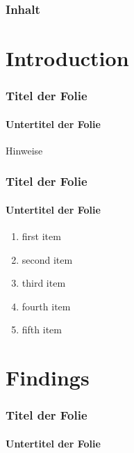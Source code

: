 \begin{frame}

\maketitle

\end{frame}

\begin{frame}
\frametitle{Inhalt}

\tableofcontents

\end{frame}

\section{Introduction}

\begin{frame}
\frametitle{Titel der Folie}
\framesubtitle{Untertitel der Folie}

\begin{alert}{Hinweise}
{\scriptsize \blindtext}
\end{alert}


\end{frame}


\begin{frame}
\frametitle{Titel der Folie}
\framesubtitle{Untertitel der Folie}

\begin{enumerate}
\item first item
\item second item
\item third item
\item fourth item
\item fifth item
\end{enumerate}


\end{frame}

\section{Findings}

\begin{frame}
\frametitle{Titel der Folie}
\framesubtitle{Untertitel der Folie}

\blindtext


\end{frame}

